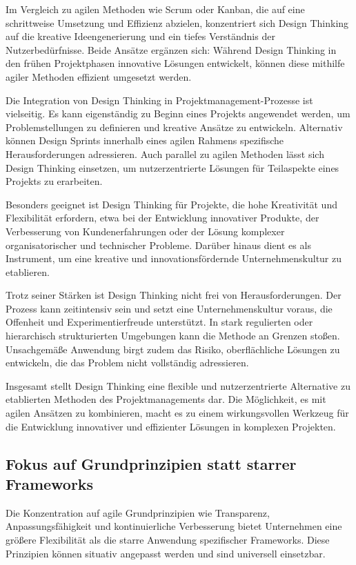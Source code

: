 \documentclass[ngerman]{seminarvorlage}
\begin{document}
Im Vergleich zu agilen Methoden wie Scrum oder Kanban, die auf eine schrittweise Umsetzung und Effizienz abzielen, konzentriert sich Design Thinking auf die kreative Ideengenerierung und ein tiefes Verständnis der Nutzerbedürfnisse. Beide Ansätze ergänzen sich: Während Design Thinking in den frühen Projektphasen innovative Lösungen entwickelt, können diese mithilfe agiler Methoden effizient umgesetzt werden.  

Die Integration von Design Thinking in Projektmanagement-Prozesse ist vielseitig. Es kann eigenständig zu Beginn eines Projekts angewendet werden, um Problemstellungen zu definieren und kreative Ansätze zu entwickeln. Alternativ können Design Sprints innerhalb eines agilen Rahmens spezifische Herausforderungen adressieren. Auch parallel zu agilen Methoden lässt sich Design Thinking einsetzen, um nutzerzentrierte Lösungen für Teilaspekte eines Projekts zu erarbeiten.  

Besonders geeignet ist Design Thinking für Projekte, die hohe Kreativität und Flexibilität erfordern, etwa bei der Entwicklung innovativer Produkte, der Verbesserung von Kundenerfahrungen oder der Lösung komplexer organisatorischer und technischer Probleme. Darüber hinaus dient es als Instrument, um eine kreative und innovationsfördernde Unternehmenskultur zu etablieren.  

Trotz seiner Stärken ist Design Thinking nicht frei von Herausforderungen. Der Prozess kann zeitintensiv sein und setzt eine Unternehmenskultur voraus, die Offenheit und Experimentierfreude unterstützt. In stark regulierten oder hierarchisch strukturierten Umgebungen kann die Methode an Grenzen stoßen. Unsachgemäße Anwendung birgt zudem das Risiko, oberflächliche Lösungen zu entwickeln, die das Problem nicht vollständig adressieren.  

Insgesamt stellt Design Thinking eine flexible und nutzerzentrierte Alternative zu etablierten Methoden des Projektmanagements dar. Die Möglichkeit, es mit agilen Ansätzen zu kombinieren, macht es zu einem wirkungsvollen Werkzeug für die Entwicklung innovativer und effizienter Lösungen in komplexen Projekten.
\cite{simschek_agilitat_2023, sp_mit_2022}

\subsection{Fokus auf Grundprinzipien statt starrer Frameworks}
Die Konzentration auf agile Grundprinzipien wie Transparenz, Anpassungsfähigkeit und kontinuierliche Verbesserung bietet Unternehmen eine grö\ss{}ere Flexibilität als die starre Anwendung spezifischer Frameworks. Diese Prinzipien können situativ angepasst werden und sind universell einsetzbar.
\cite{schonfeld_warum_2024}
\end{document}

